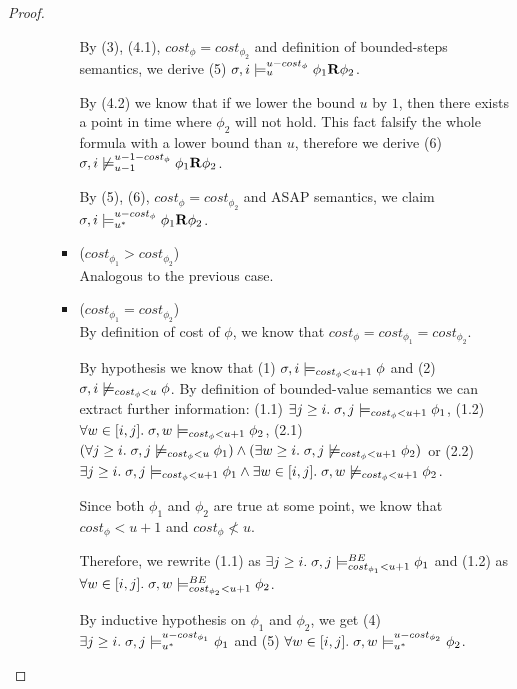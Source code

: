 \begin{theorem}
\begin{proof}
\begin{itemize}
\begin{itemize}
\begin{itemize}
            By (3), (4.1), $cost_\phi = cost_{\phi_2}$ and definition of bounded-steps semantics, we derive (5) $\sigma,i \models_{u}^{u-cost_\phi} \phi_1 \mathbf{R} \phi_2$.

            By (4.2) we know that if we lower the bound $u$ by $1$, then there exists a point in time where $\phi_2$ will not hold.
            This fact falsify the whole formula with a lower bound than $u$, therefore we derive (6) $\sigma,i \not\models_{u-1}^{u-1-cost_\phi} \phi_1 \mathbf{R} \phi_2$.

            By (5), (6), $cost_\phi = cost_{\phi_2}$ and ASAP semantics, we claim $\sigma,i \models_{{u}^*}^{u-cost_\phi} \phi_1 \mathbf{R} \phi_2$.
            
            \item ($cost_{\phi_1} > cost_{\phi_2}$) \\
            Analogous to the previous case.

            \item ($cost_{\phi_1} = cost_{\phi_2}$) \\
            By definition of cost of $\phi$, we know that $cost_\phi = cost_{\phi_1} = cost_{\phi_2}$.
            
            By hypothesis we know that 
            (1) $\sigma, i \models_{cost_\phi < u + 1} \phi$ and 
            (2) $\sigma, i \not\models_{cost_\phi < u} \phi$.
            By definition of bounded-value semantics we can extract further information: 
            (1.1) $\exists j \geq i.\; \sigma,j \models_{cost_\phi < u + 1} \phi_1$,
            (1.2) $\forall w \in [i,j].\; \sigma,w \models_{cost_\phi < u + 1} \phi_2$, 
            (2.1) $(\forall j \geq i.\; \sigma,j \not\models_{cost_\phi < u} \phi_1) \land (\exists w \geq i.\; \sigma,j \not\models_{cost_\phi < u + 1} \phi_2)$ or (2.2) $\exists j \geq i.\; \sigma,j \models_{cost_\phi < u + 1} \phi_1 \land \exists w \in [i,j].\; \sigma,w \not\models_{cost_\phi < u + 1} \phi_2$.
            
            Since both $\phi_1$ and $\phi_2$ are true at some point, we know that $cost_\phi < u + 1$ and $cost_\phi \not< u$.
            
            Therefore, we rewrite (1.1) as $\exists j \geq i.\; \sigma,j \models_{cost_{\phi_1} < u + 1}^{BE} \phi_1$ and (1.2) as $\forall w \in [i,j].\; \sigma,w \models_{cost_{\phi_2} < u + 1}^{BE} \phi_2$.

            By inductive hypothesis on $\phi_1$ and $\phi_2$, we get (4) $\exists j \geq i.\; \sigma,j \models_{{u}^*}^{u-cost_{\phi_1}} \phi_1$ and (5) $\forall w \in [i,j].\; \sigma,w \models_{{u}^*}^{u-cost_{\phi_2}} \phi_2$.


\end{itemize}
\end{itemize}
\end{itemize}
\end{proof}
\end{theorem}

